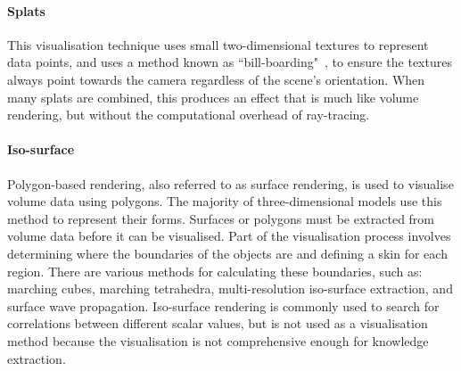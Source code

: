 \paragraph{Splats}
This visualisation technique uses small two-dimensional textures to represent data points, and uses a method known as ``bill-boarding"~\cite{Taylor2015}, to ensure the textures always point towards the camera regardless of the scene's orientation.
When many splats are combined, this produces an effect that is much like volume rendering, but without the computational overhead of ray-tracing.

\paragraph{Iso-surface}
Polygon-based rendering, also referred to as surface rendering, is used to visualise volume data using polygons.
The majority of three-dimensional models use this method to represent their forms.
Surfaces or polygons must be extracted from volume data before it can be visualised.
Part of the visualisation process involves determining where the boundaries of the objects are and defining a skin for each region.
There are various methods for calculating these boundaries, such as: marching cubes, marching tetrahedra, multi-resolution iso-surface extraction, and surface wave propagation.
Iso-surface rendering is commonly used to search for correlations between different scalar values, but is not used as a visualisation method because the visualisation is not comprehensive enough for knowledge extraction.

